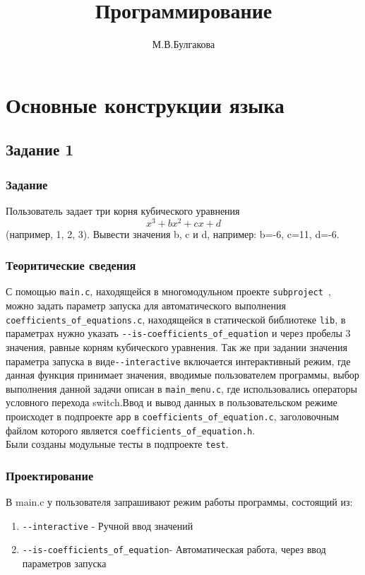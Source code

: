 \documentclass[12pt,a4paper]{report}
\author{М.В.Булгакова}
\title{Программирование}
\begin{document}
\listoftodos
\maketitle
\chapter{Основные конструкции языка}
\section{Задание 1}
\subsection{Задание}
Пользователь задает три корня кубического уравнения 
\begin{equation}
x^3+bx^2+cx+d 
\end{equation}
 (например, 1, 2, 3). Вывести значения b, c и d, например: b=-6, c=11, d=-6.
\subsection{Теоритические сведения}

С помощью \verb+main.c+, находящейся в многомодульном проекте \verb+subproject +, можно задать параметр запуска для автоматического выполнения\\ 
\verb+coefficients_of_equations.c+, находящейся в статической библиотеке \verb+lib+, в параметрах нужно указать 
\verb+--is-coefficients_of_equation+ и через пробелы 3 значения, равные корням кубического уравнения. Так же при задании значения параметра запуска в виде\verb+--interactive+ включается интерактивный режим, где данная функция принимает значения, вводимые пользователем программы, выбор выполнения данной задачи описан в \verb+main_menu.c+, где использовались операторы условного перехода switch.Ввод и вывод данных в пользовательском режиме происходет в подпроекте \verb+app+ в 
\verb+coefficients_of_equation.c+, заголовочным файлом которого является \verb+coefficients_of_equation.h+. \\ 
Были созданы модульные тесты в подпроекте \verb+test+. 

\subsection{Проектирование}
В main.c у пользователя запрашивают режим работы программы, состоящий из:
\begin{enumerate}
\item \verb+--interactive+ - Ручной ввод значений
\item \verb+--is-coefficients_of_equation+- Автоматическая работа, через ввод параметров запуска
\end{enumerate}
\end{document}
